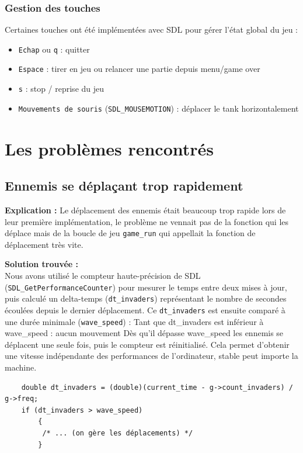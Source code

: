 \documentclass[12pt,a4paper]{report}
\begin{document}
\subsection{Gestion des touches}
Certaines touches ont été implémentées avec SDL pour gérer l’état global du jeu :
\begin{itemize}
  \item \texttt{Echap} ou \texttt{q} : quitter
  \item \texttt{Espace} : tirer en jeu ou relancer une partie depuis menu/game over
  \item \texttt{s} : stop / reprise du jeu
  \item \texttt{Mouvements de souris} (\texttt{SDL\_MOUSEMOTION}) : déplacer le tank horizontalement
\end{itemize}


\chapter{Les problèmes rencontrés}
\section{Ennemis se déplaçant trop rapidement}

\textbf{Explication :} Le déplacement des ennemis était beaucoup trop rapide lors de leur première implémentation, le problème ne vennait pas de la fonction qui les déplace mais de la boucle de jeu \texttt{game\_run} qui appellait la fonction de déplacement très vite. 

\textbf{Solution trouvée :}
\\
Nous avons utilisé le compteur haute-précision de SDL (\texttt{SDL\_GetPerformanceCounter}) pour mesurer le temps entre deux mises à jour, puis calculé un delta-temps (\texttt{dt\_invaders}) représentant le nombre de secondes écoulées depuis le dernier déplacement.
Ce \texttt{dt\_invaders} est ensuite comparé à une durée minimale (\texttt{wave\_speed}) :
Tant que dt\_invaders est inférieur à wave\_speed : aucun mouvement
Dès qu’il dépasse wave\_speed les ennemis se déplacent une seule fois, puis le compteur est réinitialisé.
Cela permet d’obtenir une vitesse indépendante des performances de l'ordinateur, stable peut importe la machine.
\begin{lstlisting}
    double dt_invaders = (double)(current_time - g->count_invaders) / g->freq;
    if (dt_invaders > wave_speed) 
        {
         /* ... (on gère les déplacements) */
        }
\end{lstlisting}
\end{document}
